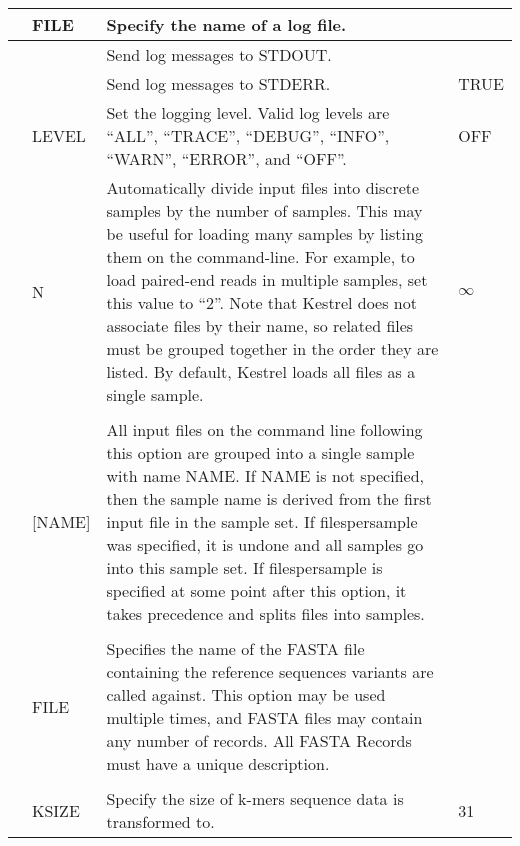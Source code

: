 \begin{small}
\begin{longtable}{|p{\optwidth}|p{\argwidth}|p{\dscwidth}|p{}|}
		\lopt{logfile} & FILE &
		Specify the name of a log file.
		&
		\\ \hline
		
		\lopt{logstdout} & &
		Send log messages to STDOUT.
		&
		\\ \hline
		
		\lopt{logstderr} & &
		Send log messages to STDERR.
		& TRUE
		\\ \hline
		
		\lopt{loglevel} & LEVEL &
		Set the logging level. Valid log levels are ``ALL'', ``TRACE'', ``DEBUG'', ``INFO'', ``WARN'', ``ERROR'', and ``OFF''.
		& OFF
		\\ \hline
		
		\lopt{filespersample} & N &
		Automatically divide input files into discrete samples by the number of samples. This may be useful for loading many samples by listing them on the command-line. For example, to load paired-end reads in multiple samples, set this value to ``2''. Note that Kestrel does not associate files by their name, so related files must be grouped together in the order they are listed. By default, Kestrel loads all files as a single sample.
		& $\infty$
		\\ \hline
		
		\optbox{\sopt{s}\\\lopt{sample}} & [NAME] &
		All input files on the command line following this option are grouped into a single sample with name NAME. If NAME is not specified, then the sample name is derived from the first input file in the sample set. If \ddash{}filespersample was specified, it is undone and all samples go into this sample set. If \ddash{}filespersample is specified at some point after this option, it takes precedence and splits files into samples.
		&
		\\ \hline
		
		\optbox{\sopt{r}\\\lopt{ref}} & FILE &
		Specifies the name of the FASTA file containing the reference sequences variants are called against. This option may be used multiple times, and FASTA files may contain any number of records. All FASTA Records must have a unique description.
		&
		\\ \hline
		
		\optbox{\sopt{k}\\\lopt{ksize}} & KSIZE &
		Specify the size of k-mers sequence data is transformed to.
		& 31
		\\ \hline
		

\end{longtable}
\end{small}

